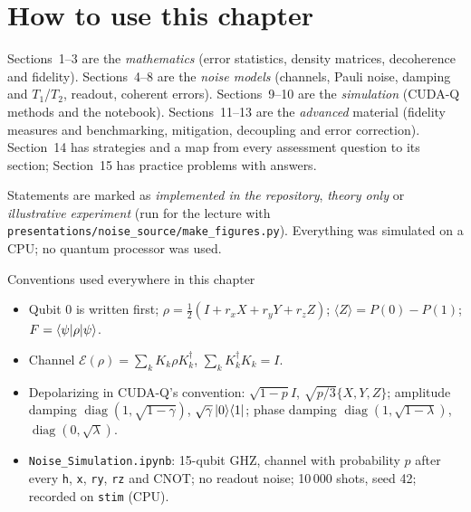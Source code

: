 \documentclass[11pt,a4paper,openany]{book}
\newcommand{\E}{\mathcal E}
\begin{document}
\section*{How to use this chapter}
Sections~1--3 are the \emph{mathematics} (error statistics, density matrices, decoherence and fidelity). Sections~4--8 are the
\emph{noise models} (channels, Pauli noise, damping and $T_1$/$T_2$, readout, coherent errors). Sections~9--10 are the
\emph{simulation} (CUDA-Q methods and the notebook). Sections~11--13 are the \emph{advanced} material (fidelity measures and
benchmarking, mitigation, decoupling and error correction). Section~14 has strategies and a map from every assessment question to
its section; Section~15 has practice problems with answers.

Statements are marked as \emph{implemented in the repository}, \emph{theory only} or \emph{illustrative experiment} (run for the lecture
with \texttt{presentations/noise\_source/make\_figures.py}). Everything was simulated on a CPU; no quantum processor was used.

\begin{defn}{Conventions used everywhere in this chapter}
\begin{itemize}[leftmargin=1.2em, itemsep=1pt]
\item Qubit 0 is written first; $\rho = \frac12(I + r_xX + r_yY + r_zZ)$; $\langle Z\rangle = P(0) - P(1)$; $F = \braket{\psi|\rho|\psi}$.
\item Channel $\E(\rho) = \sum_kK_k\rho K_k^\dagger$, $\sum_kK_k^\dagger K_k = I$.
\item Depolarizing in CUDA-Q's convention: $\sqrt{1-p}I$, $\sqrt{p/3}\{X, Y, Z\}$; amplitude damping $\operatorname{diag}(1, \sqrt{1-\gamma})$, $\sqrt\gamma\ket0\!\bra1$;
      phase damping $\operatorname{diag}(1, \sqrt{1-\lambda})$, $\operatorname{diag}(0, \sqrt\lambda)$.
\item \texttt{Noise\_Simulation.ipynb}: 15-qubit GHZ, channel with probability $p$ after every \texttt{h}, \texttt{x}, \texttt{ry}, \texttt{rz} and CNOT; no readout noise;
      10\,000 shots, seed 42; recorded on \texttt{stim} (CPU).
\end{itemize}
\end{defn}

\end{document}
